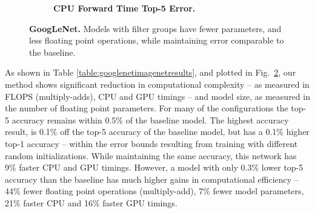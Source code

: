 \documentclass[thesis]{subfiles}
\begin{document}
\begin{figure}[tbp]
\begin{subfigure}[b]{\columnwidth}
		\centering
		\caption{\textbf{CPU Forward Time \vs Top-5 Error.}}
		\label{fig:googlenet50cpuforward}
	\end{subfigure}
	
	\caption[GoogLeNet ILSVRC root results]{\textbf{GoogLeNet.} Models with filter groups have fewer parameters, and less floating point operations, while maintaining error comparable to the baseline.}
	\label{fig:googlenet50plots}
\end{figure}
	
	As shown in Table \ref{table:googlenetimagenetresults}, and plotted in Fig.~\ref{fig:googlenet50plots}, our method shows significant reduction in computational complexity -- as measured in FLOPS (multiply-adds), CPU and GPU timings -- and model size, as measured in the number of floating point parameters. For many of the configurations the top-5 accuracy remains within 0.5\% of the baseline model. 
	The highest accuracy result, is 0.1\% off the top-5 accuracy of the baseline model, but has a 0.1\% higher top-1 accuracy -- within the error bounds resulting from training with different random initializations. While maintaining the same accuracy, this network has 9\% faster CPU and GPU timings. However, a model with only 0.3\% lower top-5 accuracy than the baseline has much higher gains in computational efficiency -- 44\% fewer floating point operations (multiply-add), 7\% fewer model parameters, 21\% faster CPU and 16\% faster GPU timings.
	
\end{document}

